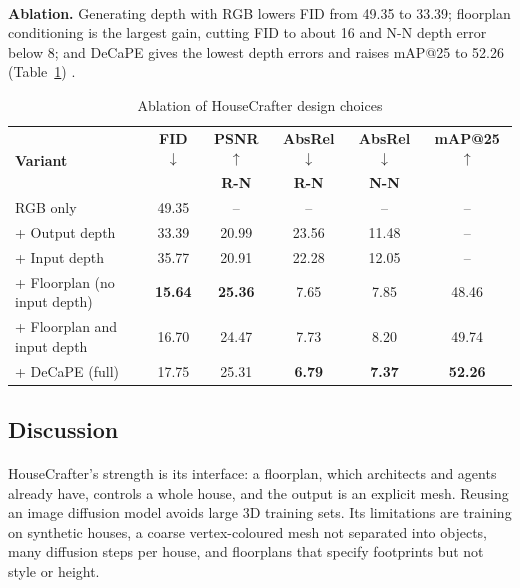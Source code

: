 \documentclass[12pt,a4paper,final]{extreport}
\begin{document}
\paragraph{} \textbf{Ablation.} Generating depth with RGB lowers FID from 49.35 to 33.39; floorplan conditioning is the largest gain, cutting FID to about 16 and N-N depth error below 8; and DeCaPE gives the lowest depth errors and raises mAP@25 to 52.26 (Table~\ref{tab:p2_ablation}) \cite{p2}.

{\renewcommand{\arraystretch}{1.12}
\begin{table}[htbp]
\centering
\caption{Ablation of HouseCrafter design choices}\label{tab:p2_ablation}
\small
\setlength{\tabcolsep}{5pt}
\begin{tabular}{|l|c|c|c|c|c|}
\hline
\multirow{2}{*}{\textbf{Variant}} & \textbf{FID $\downarrow$} & \textbf{PSNR $\uparrow$} & \textbf{AbsRel $\downarrow$} & \textbf{AbsRel $\downarrow$} & \textbf{mAP@25 $\uparrow$} \\
 & & \textbf{R-N} & \textbf{R-N} & \textbf{N-N} & \\ \hline
RGB only & 49.35 & -- & -- & -- & -- \\ \hline
+ Output depth & 33.39 & 20.99 & 23.56 & 11.48 & -- \\ \hline
+ Input depth & 35.77 & 20.91 & 22.28 & 12.05 & -- \\ \hline
+ Floorplan (no input depth) & \textbf{15.64} & \textbf{25.36} & 7.65 & 7.85 & 48.46 \\ \hline
+ Floorplan and input depth & 16.70 & 24.47 & 7.73 & 8.20 & 49.74 \\ \hline
+ DeCaPE (full) & 17.75 & 25.31 & \textbf{6.79} & \textbf{7.37} & \textbf{52.26} \\ \hline
\end{tabular}
\end{table}}

\subsection{Discussion}

\paragraph{} HouseCrafter's strength is its interface: a floorplan, which architects and agents already have, controls a whole house, and the output is an explicit mesh. Reusing an image diffusion model avoids large 3D training sets. Its limitations are training on synthetic houses, a coarse vertex-coloured mesh not separated into objects, many diffusion steps per house, and floorplans that specify footprints but not style or height.
\end{document}
